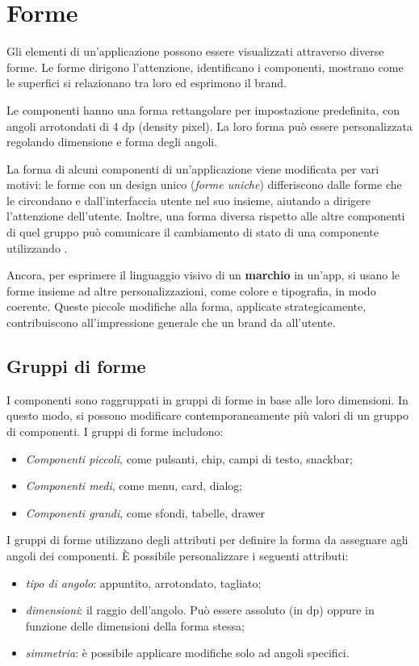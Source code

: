 \documentclass[12pt, a4paper]{report}
\begin{document}
	\section{Forme}
	Gli elementi di un’applicazione possono essere visualizzati attraverso diverse forme. Le forme dirigono l'attenzione, identificano i componenti, mostrano come le superfici si relazionano tra loro ed esprimono il brand.


	Le componenti hanno una forma rettangolare per impostazione predefinita, con angoli arrotondati di 4 dp (density pixel). La loro forma può essere personalizzata regolando dimensione e forma degli angoli.

	La forma di alcuni componenti di un’applicazione viene modificata per vari motivi: le forme con un design unico (\textit{forme uniche}) differiscono dalle forme che le circondano e dall'interfaccia utente nel suo insieme, aiutando a dirigere l'attenzione dell'utente.
	Inoltre, una forma diversa rispetto alle altre componenti di quel gruppo può comunicare il cambiamento di stato di una componente utilizzando .

	Ancora, per esprimere il linguaggio visivo di un \textbf{marchio} in un'app, si usano le forme insieme ad altre personalizzazioni, come colore e tipografia, in modo coerente.
	Queste piccole modifiche alla forma, applicate strategicamente, contribuiscono all'impressione generale che un brand da all’utente.


	\subsection{Gruppi di forme}
	I componenti sono raggruppati in gruppi di forme in base alle loro dimensioni. In questo modo, si possono modificare contemporaneamente più valori di un gruppo di componenti. I gruppi di forme includono:
	\begin{itemize}
		\item \textit{Componenti piccoli}, come pulsanti, chip, campi di testo, snackbar;
		\item \textit{Componenti medi}, come menu, card, dialog;
		\item \textit{Componenti grandi}, come sfondi, tabelle, drawer
	\end{itemize}


	I gruppi di forme utilizzano degli attributi per definire la forma da assegnare agli angoli dei componenti. È possibile personalizzare i seguenti attributi:
	\begin{itemize}
		\item \textit{tipo di angolo}: appuntito, arrotondato, tagliato;
		\item \textit{dimensioni}: il raggio dell'angolo. Può essere assoluto (in dp) oppure in funzione delle dimensioni della forma stessa;
		\item \textit{simmetria}: è possibile applicare modifiche solo ad angoli specifici.
	\end{itemize}
\end{document}
